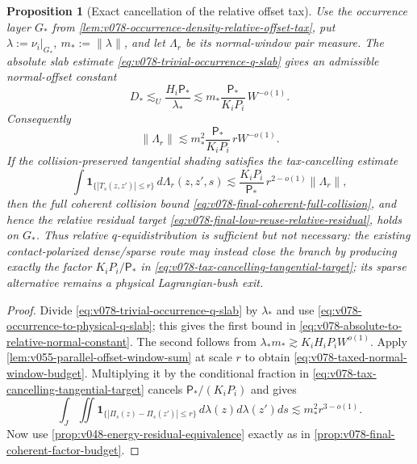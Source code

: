\documentclass[10pt]{article}
\newtheorem{proposition}[theorem]{Proposition}
\begin{document}
\begin{proposition}[Exact cancellation of the relative offset tax]
\label{prop:v078-relative-offset-tax-cancellation}
Use the occurrence layer \(G_*\) from
\cref{lem:v078-occurrence-density-relative-offset-tax}, put
\(\lambda:=\nu_i|_{G_*},\ m_*:=\|\lambda\|\), and let \(\Lambda_r\) be its normal-window pair
measure.  The absolute slab estimate \eqref{eq:v078-trivial-occurrence-q-slab} gives an admissible
normal-offset constant
\begin{equation}
\label{eq:v078-absolute-to-relative-normal-constant}
\boxed{
D_*
\lesssim_U
\frac{H_i\mathsf P_*}{\lambda_*}
\lesssim
m_*\frac{\mathsf P_*}{K_iP_i}\,W^{-o(1)}.
}
\end{equation}
Consequently
\begin{equation}
\label{eq:v078-taxed-normal-window-budget}
\boxed{
\|\Lambda_r\|
\lesssim
m_*^2\frac{\mathsf P_*}{K_iP_i}\,rW^{-o(1)}.
}
\end{equation}
If the collision-preserved tangential shading satisfies the tax-cancelling estimate
\begin{equation}
\label{eq:v078-tax-cancelling-tangential-target}
\boxed{
\int
\mathbf 1_{\{|T_s(z,z')|\le r\}}\,d\Lambda_r(z,z',s)
\lesssim
\frac{K_iP_i}{\mathsf P_*}\,r^{2-o(1)}\|\Lambda_r\|,
}
\end{equation}
then the full coherent collision bound
\eqref{eq:v078-final-coherent-full-collision}, and hence the relative residual target
\eqref{eq:v078-final-low-reuse-relative-residual}, holds on \(G_*\).
Thus relative \(q\)-equidistribution is sufficient but not necessary: the existing
contact-polarized dense/sparse route may instead close the branch by producing exactly the factor
\(K_iP_i/\mathsf P_*\) in \eqref{eq:v078-tax-cancelling-tangential-target}; its sparse alternative remains a
physical Lagrangian-bush exit.
\end{proposition}

\begin{proof}
Divide \eqref{eq:v078-trivial-occurrence-q-slab} by \(\lambda_*\) and use
\eqref{eq:v078-occurrence-to-physical-q-slab}; this gives the first bound in
\eqref{eq:v078-absolute-to-relative-normal-constant}.  The second follows from
\(\lambda_*m_*\gtrsim K_iH_iP_iW^{o(1)}\).  Apply
\cref{lem:v055-parallel-offset-window-sum} at scale \(r\) to obtain
\eqref{eq:v078-taxed-normal-window-budget}.  Multiplying it by the conditional fraction in
\eqref{eq:v078-tax-cancelling-tangential-target} cancels
\(\mathsf P_* /(K_iP_i)\) and gives
\[
\int_J\iint
\mathbf 1_{\{|\Pi_s(z)-\Pi_s(z')|\le r\}}
\,d\lambda(z)d\lambda(z')ds
\lesssim
m_*^2r^{3-o(1)}.
\]
Now use \cref{prop:v048-energy-residual-equivalence} exactly as in
\cref{prop:v078-final-coherent-factor-budget}.
\end{proof}
\end{document}
